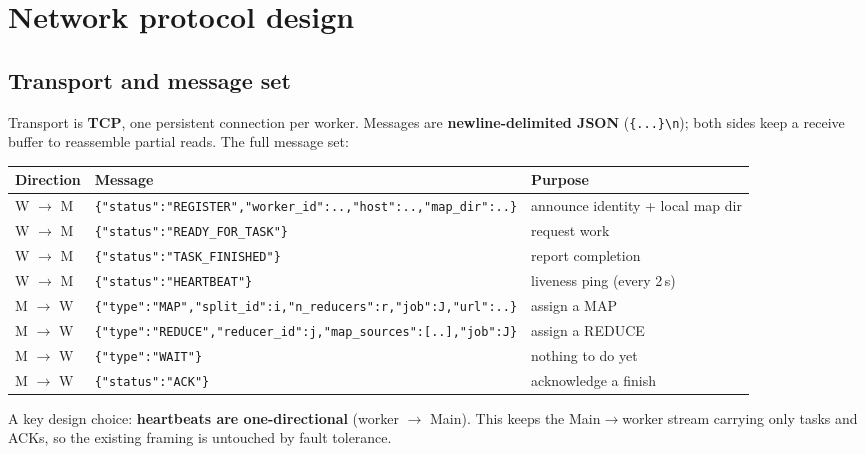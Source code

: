 \documentclass[11pt,a4paper]{article}
\newcommand{\code}[1]{\texttt{\small #1}}
\begin{document}
\section{Network protocol design}\label{sec:protocol}

\subsection{Transport and message set}

Transport is \textbf{TCP}, one persistent connection per worker. Messages are
\textbf{newline-delimited JSON} (\code{\{...\}\textbackslash n}); both sides keep
a receive buffer to reassemble partial reads. The full message set:

\begin{table}[H]
\centering
\small
\renewcommand{\arraystretch}{1.2}
\begin{tabularx}{\textwidth}{@{}llX@{}}
\toprule
\textbf{Direction} & \textbf{Message} & \textbf{Purpose}\\
\midrule
W $\to$ M & \code{\{"status":"REGISTER","worker\_id":..,"host":..,"map\_dir":..\}} & announce identity + local map dir\\
W $\to$ M & \code{\{"status":"READY\_FOR\_TASK"\}} & request work\\
W $\to$ M & \code{\{"status":"TASK\_FINISHED"\}} & report completion\\
W $\to$ M & \code{\{"status":"HEARTBEAT"\}} & liveness ping (every 2\,s)\\
M $\to$ W & \code{\{"type":"MAP","split\_id":i,"n\_reducers":r,"job":J,"url":..\}} & assign a MAP\\
M $\to$ W & \code{\{"type":"REDUCE","reducer\_id":j,"map\_sources":[..],"job":J\}} & assign a REDUCE\\
M $\to$ W & \code{\{"type":"WAIT"\}} & nothing to do yet\\
M $\to$ W & \code{\{"status":"ACK"\}} & acknowledge a finish\\
\bottomrule
\end{tabularx}
\end{table}

A key design choice: \textbf{heartbeats are one-directional} (worker $\to$ Main).
This keeps the Main$\to$worker stream carrying only tasks and ACKs, so the
existing framing is untouched by fault tolerance.
\end{document}
